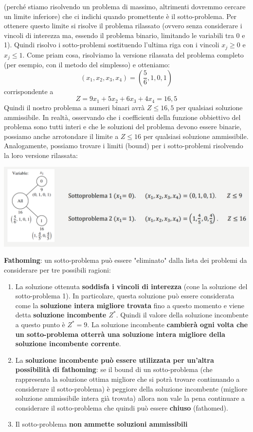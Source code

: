\documentclass[12pt]{article}
\begin{document}
(perché stiamo risolvendo un problema di massimo, altrimenti dovremmo cercare un limite inferiore) che ci indichi
quando promettente è il sotto-problema. Per ottenere questo limite si risolve il problema rilassato (ovvero senza considerare i vincoli
di interezza ma, essendo il problema binario, limitando le variabili tra 0 e 1). Quindi risolvo i sotto-problemi sostituendo l'ultima riga
con i vincoli $x_j \geq 0$ e $x_j \leq 1$.
Come priam cosa, risolviamo la versione rilassata del problema completo (per esempio, con il metodo del simplesso) e otteniamo:
$$(x_1, x_2, x_3, x_4) = (\frac{5}{6}, 1, 0, 1)$$
corrispondente a
$$Z = 9x_1 + 5x_2 + 6x_3 + 4x_4 = 16,5$$
Quindi il nostro problema a numeri binari avrà $Z \leq 16,5$ per qualsiasi soluzione ammissibile.
In realtà, osservando che i coefficienti della funzione obbiettivo del problema sono tutti interi e che le soluzioni del problema devono essere binarie,
possiamo anche arrotondare il limite a $Z \leq 16$ per qualsiasi soluzione ammissibile.
Analogamente, possiamo trovare i limiti (bound) per i sotto-problemi risolvendo la loro versione rilassata:
\begin{center}
    \includegraphics[width = 1\linewidth]{Images/66.png}
\end{center}
\textbf{Fathoming}: un sotto-problema può essere "eliminato" dalla lista dei problemi da considerare per tre possibili ragioni:
\begin{enumerate}
    \item La soluzione ottenuta \textbf{soddisfa i vincoli di interezza} (cone la soluzione del sotto-problema 1). In particolare, questa soluzione può essere considerata come la \textbf{soluzione intera migliore trovata} fino a questo momento e 
    viene detta \textbf{soluzione incombente $Z^*$}. Quindi il valore della soluzione incombente a questo punto è $Z^* = 9$.
    La soluzione incombente \textbf{cambierà ogni volta che un sotto-problema otterrà una soluzione intera migliore della soluzione incombente corrente}.
    \item La \textbf{soluzione incombente può essere utilizzata per un'altra possibilità di fathoming}: se il bound di un sotto-problema (che rappresenta la soluzione ottima migliore che si potrà trovare continuando a considerare il sotto-problema)
    è peggiore della soluzione incombente (migliore soluzione ammissibile intera già trovata) allora non vale la pena continuare a considerare il sotto-problema che quindi può essere \textbf{chiuso} (fathomed).
    \item Il sotto-problema \textbf{non ammette soluzioni ammissibili}
\end{enumerate}
\end{document}
